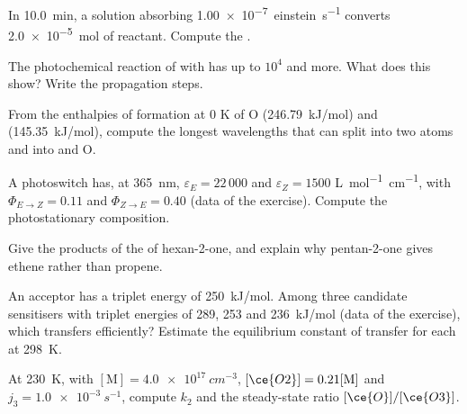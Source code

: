 \begin{exercise}[$\star$]\label{exo:b3:photochemistry:2}
In \qty{10.0}{min}, a solution absorbing \qty{1.00e-7}{einstein.s^{-1}} converts
\qty{2.0e-5}{mol} of reactant. Compute the .
\end{exercise}

\begin{exercise}[$\star$]\label{exo:b3:photochemistry:3}
The photochemical reaction of  with  has  up to $10^4$ and
more. What does this show? Write the propagation steps.
\end{exercise}

\begin{exercise}[$\star$]\label{exo:b3:photochemistry:4}
From the enthalpies of formation at 0 K of O (\qty{246.79}{kJ/mol}) and 
(\qty{145.35}{kJ/mol}), compute the longest wavelengths that can split  into two
atoms and  into  and O.
\end{exercise}

\begin{exercise}[$\star\star$]\label{exo:b3:photochemistry:5}
A photoswitch has, at \qty{365}{nm}, $\varepsilon_E = 22\,000$ and $\varepsilon_Z = 1500$ \unit{L.mol^{-1}.cm^{-1}}, with
$\Phi_{E\to Z} = 0.11$ and $\Phi_{Z\to E} = 0.40$ (data of the exercise). Compute the photostationary
composition.
\end{exercise}

\begin{exercise}[$\star\star$]\label{exo:b3:photochemistry:6}
Give the products of the  of hexan-2-one, and explain
why pentan-2-one gives ethene rather than propene.
\end{exercise}

\begin{exercise}[$\star\star$]\label{exo:b3:photochemistry:7}
An acceptor has a triplet energy of \qty{250}{kJ/mol}. Among three candidate
sensitisers with triplet energies of 289, 253 and \qty{236}{kJ/mol} (data of the
exercise), which transfers efficiently? Estimate the equilibrium constant of
transfer for each at \qty{298}{K}.
\end{exercise}

\begin{exercise}[$\star\star$]\label{exo:b3:photochemistry:8}
At \qty{230}{K}, with $[\mathrm M] = \qty{4.0e17}{cm^{-3}}$, $[\ce{O2}] = 0.21[\mathrm M]$ and $j_3 = \qty{1.0e-3}{s^{-1}}$,
compute $k_2$ and the steady-state ratio $[\ce{O}]/[\ce{O3}]$.
\end{exercise}


